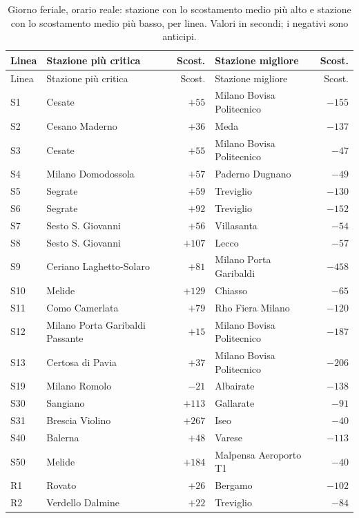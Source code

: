 {\small
\begin{longtable}{@{}l>{\raggedright\arraybackslash}p{}r>{\raggedright\arraybackslash}p{}r@{}}
	\caption{Giorno feriale, orario reale: stazione con lo scostamento medio più alto e stazione con lo scostamento medio più basso, per linea. Valori in secondi; i negativi sono anticipi.}\label{tab:linee-stazioni}\\
	\toprule
	Linea & Stazione più critica & Scost. & Stazione migliore & Scost. \\
	\midrule
	\endfirsthead
	\toprule
	Linea & Stazione più critica & Scost. & Stazione migliore & Scost. \\
	\midrule
	\endhead
	S1 & Cesate & $+55$ & Milano Bovisa Politecnico & $-155$ \\
	S2 & Cesano Maderno & $+36$ & Meda & $-137$ \\
	S3 & Cesate & $+55$ & Milano Bovisa Politecnico & $-47$ \\
	S4 & Milano Domodossola & $+57$ & Paderno Dugnano & $-49$ \\
	S5 & Segrate & $+59$ & Treviglio & $-130$ \\
	S6 & Segrate & $+92$ & Treviglio & $-152$ \\
	S7 & Sesto S. Giovanni & $+56$ & Villasanta & $-54$ \\
	S8 & Sesto S. Giovanni & $+107$ & Lecco & $-57$ \\
	S9 & Ceriano Laghetto-Solaro & $+81$ & Milano Porta Garibaldi & $-458$ \\
	S10 & Melide & $+129$ & Chiasso & $-65$ \\
	S11 & Como Camerlata & $+79$ & Rho Fiera Milano & $-120$ \\
	S12 & Milano Porta Garibaldi Passante & $+15$ & Milano Bovisa Politecnico & $-187$ \\
	S13 & Certosa di Pavia & $+37$ & Milano Bovisa Politecnico & $-206$ \\
	S19 & Milano Romolo & $-21$ & Albairate & $-138$ \\
	S30 & Sangiano & $+113$ & Gallarate & $-91$ \\
	S31 & Brescia Violino & $+267$ & Iseo & $-40$ \\
	S40 & Balerna & $+48$ & Varese & $-113$ \\
	S50 & Melide & $+184$ & Malpensa Aeroporto T1 & $-40$ \\
	R1 & Rovato & $+26$ & Bergamo & $-102$ \\
	R2 & Verdello Dalmine & $+22$ & Treviglio & $-84$ \\

\end{longtable}}

